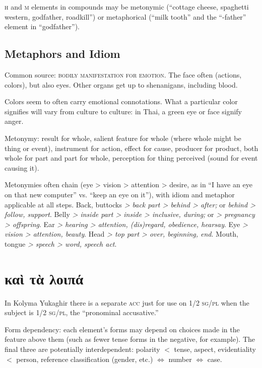 \documentclass[11pt]{article}
\newcommand{\I}[1]{\textsc{#1}}   %
\begin{document}
{\noindent \I{h} and \I{m} elements in compounds may be metonymic
(``cottage cheese, spaghetti western, godfather, roadkill'') or
metaphorical (``milk tooth'' and the ``-father'' element in
``godfather'').


\subsection{Metaphors and Idiom}
Common source: \I{bodily manifestation for emotion}. The face often
(actions, colors), but also eyes. Other organs get up to shenanigans,
including blood.

Colors seem to often carry emotional connotations.  What a
particular color signifies will vary from culture to culture: in Thai,
a green eye or face signify anger.

Metonymy: result for whole, salient feature for whole (where whole
might be thing or event), instrument for action, effect for cause,
producer for product, both whole for part and part for whole,
perception for thing perceived (sound for event causing it).

Metonymies often chain (eye > vision > attention > desire, as in ``I
have an eye on that new computer'' vs. ``keep an eye on it''), with
idiom and metaphor applicable at all steps.  Back, buttocks \textit{>
back part > behind > after;} or \textit{behind > follow, support}.
Belly \textit{> inside part > inside > inclusive, during;} or
\textit{> pregnancy > offspring}.  Ear \textit{> hearing > attention,
(dis)regard, obedience, hearsay}.  Eye \textit{> vision > attention,
beauty}.  Head \textit{> top part > over, beginning, end}.  Mouth,
tongue \textit{> speech > word, speech act}.




\section{καὶ τὰ λοιπά}
In Kolyma Yukaghir there is a separate \I{acc} just for use on \I{1/2
sg/pl} when the subject is \I{1/2 sg/pl}, the ``pronominal
accusative.'' 

Form dependency: each element's forms may depend on choices made in
the feature above them (such as fewer tense forms in the negative, for
example).  The final three are potentially interdependent: polarity
$<$ tense, aspect, evidentiality $<$ person, reference classification
(gender, etc.) $\Leftrightarrow$ number $\Leftrightarrow$ case.

}
\end{document}
